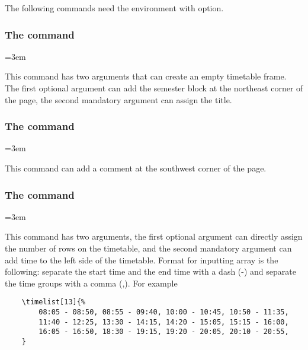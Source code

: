 \documentclass[letterpaper]{l3doc}
\newenvironment{example}{\begin{list}{}{\leftmargin=3em}\item }{\end{list}}
\begin{document}
The following commands need the  environment with  option.

\subsubsection{The  command}

\begin{example}
\end{example}

This command has two arguments that can create an empty timetable frame. The first optional argument can add the semester block at the northeast corner of the page, the second mandatory argument can assign the title.

\subsubsection{The  command}

\begin{example}
\end{example}

This command can add a comment at the southwest corner of the page.

\subsubsection{The  command}

\begin{example}
\end{example}

This command has two arguments, the first optional argument  can directly assign the number of rows on the timetable, and the second mandatory argument  can add time to the left side of the timetable. Format for inputting array is the following: separate the start time and the end time with a dash (-) and separate the time groups with a comma (,). For example

\begin{Verbatim}
    \timelist[13]{%
        08:05 - 08:50, 08:55 - 09:40, 10:00 - 10:45, 10:50 - 11:35,
        11:40 - 12:25, 13:30 - 14:15, 14:20 - 15:05, 15:15 - 16:00,
        16:05 - 16:50, 18:30 - 19:15, 19:20 - 20:05, 20:10 - 20:55,
    }
\end{Verbatim}
\end{document}
